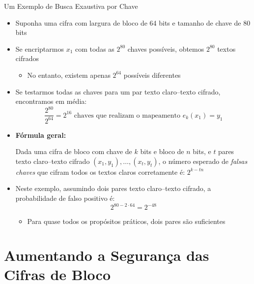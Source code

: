 \documentclass{beamer}
\begin{document}
\begin{frame}{Um Exemplo de Busca Exaustiva por Chave}

\begin{itemize}
    \item Suponha uma cifra com largura de bloco de 64 bits e tamanho de chave de 80 bits
    \item Se encriptarmos $x_1$ com todas as $2^{80}$ chaves possíveis, obtemos $2^{80}$ textos cifrados
    \begin{itemize}
        \item No entanto, existem apenas $2^{64}$ possíveis diferentes
    \end{itemize}

    \item Se testarmos todas as chaves para um par texto claro–texto cifrado, encontramos em média:
    \[
    \frac{2^{80}}{2^{64}} = 2^{16} \text{ chaves que realizam o mapeamento } e_k(x_1) = y_1
    \]
    \vspace{-0.5em}
    \item \textbf{Fórmula geral:}
    \vspace{-0.5em}
    \begin{block}{}
    \small Dada uma cifra de bloco com chave de $k$ bits e bloco de $n$ bits, e $t$ pares texto claro–texto cifrado $(x_1, y_1), \ldots, (x_t, y_t)$, o número esperado de \textit{falsas chaves} que cifram todos os textos claros corretamente é: $2^{k - tn}$
    \end{block}

    \item Neste exemplo, assumindo dois pares texto claro–texto cifrado, a probabilidade de falso positivo é:
    \[
    2^{80 - 2 \cdot 64} = 2^{-48}
    \]

    \begin{itemize}
        \item Para quase todos os propósitos práticos, dois pares são suficientes
    \end{itemize}
\end{itemize}

\end{frame}


\section{Aumentando a Segurança das Cifras de Bloco}
\end{document}
